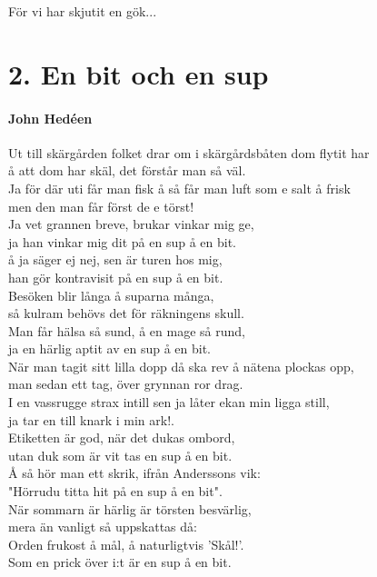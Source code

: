 \documentclass[11pt]{book}
\begin{document}
För vi har skjutit en gök...




\newpage


\section*{2. En bit och en sup}
\paragraph*{John Hedéen}
$$$$
Ut till skärgården folket drar om i skärgårdsbåten dom flytit har\\
å att dom har skäl, det förstår man så väl.\\
Ja för där uti får man fisk å så får man luft som e salt å frisk\\
men den man får först de e törst!\\
Ja vet grannen breve, brukar vinkar mig ge,\\
ja han vinkar mig dit på en sup å en bit.\\
å ja säger ej nej, sen är turen hos mig,\\
han gör kontravisit på en sup å en bit.\\

\noindent
Besöken blir långa å suparna många,\\
så kulram behövs det för räkningens skull.\\
Man får hälsa så sund, å en mage så rund,\\
ja en härlig aptit av en sup å en bit.\\

\noindent
När man tagit sitt lilla dopp då ska rev å nätena plockas opp,\\
man sedan ett tag, över grynnan ror drag.\\
I en vassrugge strax intill sen ja låter ekan min ligga still,\\
ja tar en till knark i min ark!.\\
Etiketten är god, när det dukas ombord,\\
utan duk som är vit tas en sup å en bit.\\
Å så hör man ett skrik, ifrån Anderssons vik:\\
"Hörrudu titta hit på en sup å en bit".\\

\noindent
När sommarn är härlig är törsten besvärlig,\\
mera än vanligt så uppskattas då:\\
Orden frukost å mål, å naturligtvis 'Skål!'.\\
Som en prick över i:t är en sup å en bit.\\
\end{document}
